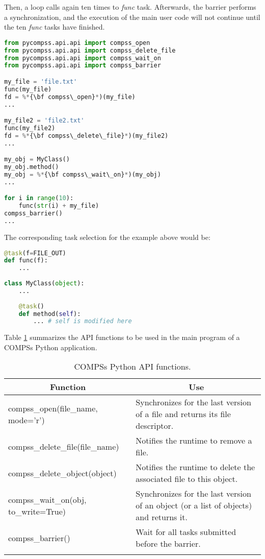 Then, a loop calls again ten times to {\it func} task.
Afterwards, the barrier performs a synchronization, and the execution of the main user code will
not continue until the ten {\it func} tasks have finished.

\begin{lstlisting}[language=python]
from pycompss.api.api import compss_open
from pycompss.api.api import compss_delete_file
from pycompss.api.api import compss_wait_on
from pycompss.api.api import compss_barrier

my_file = 'file.txt'
func(my_file)
fd = %*{\bf compss\_open}*)(my_file)
...

my_file2 = 'file2.txt'
func(my_file2)
fd = %*{\bf compss\_delete\_file}*)(my_file2)
...

my_obj = MyClass()
my_obj.method()
my_obj = %*{\bf compss\_wait\_on}*)(my_obj)
...

for i in range(10):
    func(str(i) + my_file)
compss_barrier()
...
\end{lstlisting}

The corresponding task selection for the example above would be:

\begin{lstlisting}[language=python]
@task(f=FILE_OUT)
def func(f):
    ...
    
class MyClass(object):
    ...
    
    @task()
    def method(self):
        ... # self is modified here
\end{lstlisting}

Table \ref{tab:python_api_functions} summarizes the API functions to be used in the main program of a COMPSs Python application.
\bgroup
  \def\arraystretch{1.5}%
  \begin{longtable}{| p{} | p{} |}
    \hline
    \multicolumn{1}{|c|}{{\bf Function }}    &  \multicolumn{1}{c|}{{\bf Use }}\\
    \hline
    compss\_open(file\_name, mode='r') & Synchronizes for the last version of a file and returns its file descriptor. \\
    \hline
    compss\_delete\_file(file\_name) & Notifies the runtime to remove a file. \\
    \hline
    compss\_delete\_object(object) & Notifies the runtime to delete the associated file to this object. \\
    \hline
    compss\_wait\_on(obj, to\_write=True) & Synchronizes for the last version of an object (or a list of objects) and returns it. \\
    \hline
    compss\_barrier() & Wait for all tasks submitted before the barrier. \\
    \hline
    \caption{COMPSs Python API functions.}
    \label{tab:python_api_functions}
  \end{longtable}
\egroup


